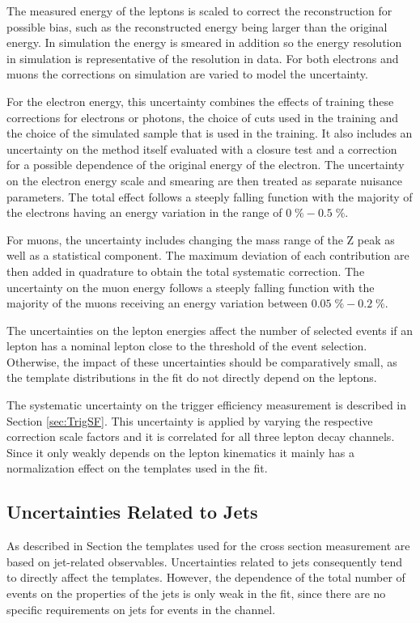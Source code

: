 The measured energy of the leptons is scaled to correct the reconstruction for possible bias, such as the reconstructed energy being larger than the original energy. In simulation the energy is smeared in addition so the energy resolution in simulation is representative of the resolution in data.
For both electrons and muons the corrections on simulation are varied to model the uncertainty.

For the electron energy, this uncertainty combines the effects of training these corrections for electrons or photons, the choice of cuts used in the training and the choice of the simulated sample that is used in the training. It also includes an uncertainty on the method itself evaluated with a closure test and a correction for a possible
dependence of the original energy of the electron.
The uncertainty on the electron energy scale and smearing are then treated as separate nuisance parameters.
The total effect follows a steeply falling function with the majority of the electrons having an energy variation in the range of $0 \; \% - 0.5 \; \%$.

For muons, the uncertainty includes changing the mass range of the Z peak as well as a statistical component. The maximum deviation of each contribution are then added in quadrature to obtain the total systematic correction.
The uncertainty on the muon energy follows a steeply falling function with the majority of the muons receiving an energy variation between $0.05 \; \% - 0.2 \; \%$.

The uncertainties on the lepton energies affect the number of selected events if an lepton has a nominal lepton \pt close to the threshold of the event selection.
Otherwise, the impact of these uncertainties should be comparatively small, as the template distributions in the fit do not directly depend on the leptons.

The systematic uncertainty on the trigger efficiency measurement is described in Section \ref{sec:TrigSF}. This uncertainty is applied by varying the respective correction scale factors
and it is correlated for all three lepton decay channels. Since it only weakly depends on the lepton kinematics it mainly has a normalization effect on the templates used in the fit.

\subsection{Uncertainties Related to Jets}

As described in Section  the templates used for the cross section measurement are based on jet-related observables.
Uncertainties related to jets consequently tend to directly affect the templates. However, the dependence of the total number of events on the properties of the jets is only weak in the fit,
since there are no specific requirements on jets for events in the \emu channel.

